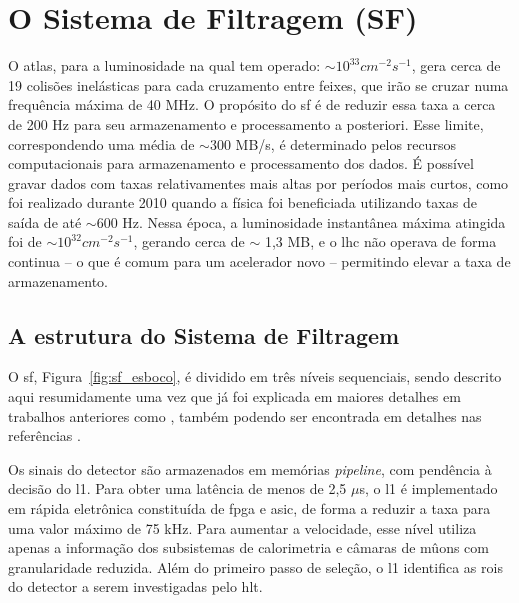 \section{O Sistema de Filtragem (SF)}
\label{sec:sf}


O \gls{atlas}, para a luminosidade na qual tem operado: $\sim10^{33}cm^{-2}s^{-1}$,
gera cerca de 19 colisões inelásticas para cada cruzamento entre
feixes, que irão se cruzar numa frequência máxima de 40 MHz. O propósito do
\gls{sf} \cite{trigger_perf_2010,trigger_tdr} é de reduzir essa taxa a cerca
de 200 Hz para seu armazenamento e processamento a posteriori. Esse
limite, correspondendo uma média de $\sim$300 MB/s, é determinado pelos recursos
computacionais para armazenamento e processamento dos dados. É possível gravar
dados com taxas relativamentes mais altas por períodos mais curtos, como foi
realizado durante 2010 quando a física foi beneficiada utilizando taxas de saída
de até $\sim$600 Hz. Nessa época, a luminosidade instantânea máxima atingida foi de
$\sim10^{32}cm^{-2}s^{-1}$, gerando cerca de $\sim$ 1,3 MB, e o \gls{lhc} não 
operava de forma continua -- o que é comum para um acelerador novo -- permitindo 
elevar a taxa de armazenamento.

\subsection{A estrutura do Sistema de Filtragem}
\label{ssec:estru_sf}

O \gls{sf}, Figura~\ref{fig:sf_esboco}, é dividido em três níveis sequenciais,
sendo descrito aqui resumidamente uma vez que já foi explicada em maiores detalhes em
trabalhos anteriores como \cite{tese_eduardo,tese_torres}, também podendo ser encontrada 
em detalhes nas referências \cite{trigger_tdr,l1_trigger_tdr,l2_ef_daq_dcs_tdr,trigger_perfomance}.

Os sinais do detector são armazenados em memórias \emph{pipeline}, com pendência
à decisão do \acrshort{l1}. Para obter uma latência de menos de 2,5 $\mu$s, 
o \gls{l1} é implementado em rápida eletrônica constituída de \gls{fpga} e
\gls{asic}, de forma a reduzir a taxa para uma valor máximo de 75 kHz. Para
aumentar a velocidade, esse nível utiliza apenas a informação dos subsistemas de
calorimetria e câmaras de mûons com granularidade reduzida. Além do
primeiro passo de seleção, o \gls{l1} identifica as \glspl{roi} do detector a
serem investigadas pelo \acrshort{hlt}. 

